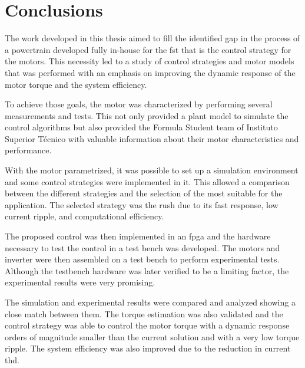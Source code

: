 
\chapter{Conclusions}
\label{chapter:conclusions}

The work developed in this thesis aimed to fill the identified gap in the process of a powertrain developed fully in-house for the \gls{fst} that is the control strategy for the motors. This necessity led to a study of control strategies and motor models that was performed with an emphasis on improving the dynamic response of the motor torque and the system efficiency.

To achieve those goals, the motor was characterized by performing several measurements and tests. This not only provided a plant model to simulate the control algorithms but also provided the Formula Student team of Instituto Superior Técnico with valuable information about their motor characteristics and performance.

 With the motor parametrized, it was possible to set up a simulation environment and some control strategies were implemented in it. This allowed a comparison between the different strategies and the selection of the most suitable for the application. The selected strategy was the \acrfull{rush} due to its fast response, low current ripple, and computational efficiency. 

The proposed control was then implemented in an \gls{fpga} and the hardware necessary to test the control in a test bench was developed. The motors and inverter were then assembled on a test bench to perform experimental tests. Although the testbench hardware was later verified to be a limiting factor, the experimental results were very promising.

The simulation and experimental results were compared and analyzed showing a close match between them. The torque estimation was also validated and the control strategy was able to control the motor torque with a dynamic response orders of magnitude smaller than the current solution and with a very low torque ripple. The system efficiency was also improved due to the reduction in current \gls{thd}.

